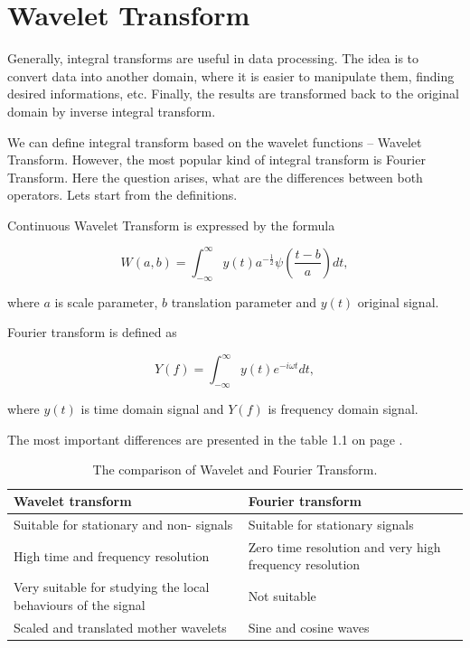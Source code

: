 \section{Wavelet Transform}

Generally, integral transforms are useful in data processing. The idea is to convert data into another domain, where it is easier to manipulate them, finding desired informations, etc. Finally, the results are transformed back to the original domain by inverse integral transform.

We can define integral transform based on the wavelet functions -- Wavelet Transform.
However, the most popular kind of integral transform is Fourier Transform. Here the question arises, what are the differences between both operators. Lets start from the definitions.

\begin{defn}
\label{def:CWT}
Continuous Wavelet Transform is expressed by the formula

\begin{equation}
W(a,b)=\int_{-\infty}^{\infty} y(t) a^{-\frac{1}{2}} \psi\left(\frac{t-b}{a}\right) dt,
\end{equation}

where $a$ is scale parameter, $b$ translation parameter and $y(t)$ original signal.
\end{defn}


\begin{defn}
Fourier transform is defined as

\begin{equation}
Y(f)=\int_{-\infty}^{\infty} y(t) e^{-i\omega t} dt,
\end{equation}

where $y(t)$ is time domain signal and $Y(f)$ is frequency domain signal.
\end{defn}

The most important differences are presented in the table 1.1 on page \pageref{tab}.

\begin{table}[h]
\centering
\begin{tabular}{|p{}|p{}|}
\toprule
\textbf{ Wavelet transform} & \textbf{Fourier transform}
\\ \midrule
Suitable for stationary and non-\allowbreak{stationary} signals 
& Suitable for stationary signals 
\\ \midrule
High time and frequency resolution
& Zero time resolution and very high frequency resolution     
\\ \midrule
Very suitable for studying the local behaviours of the signal
& Not suitable  
\\ \midrule
Scaled and translated mother wavelets
& Sine and cosine waves
\\ \bottomrule
\end{tabular}
\label{tab}
\caption{The comparison of Wavelet and Fourier Transform.}
\end{table}

